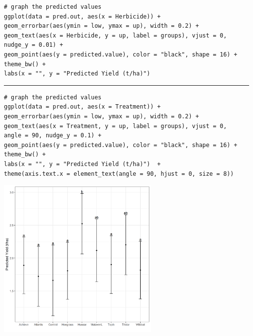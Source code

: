 \documentclass[a4paper, 10pt, fleqn, twosided]{memoir}
\begin{document}
\begin{tcolorbox}[title = Example 7 Graph of predicted values]
\begin{verbatim}
# graph the predicted values 
ggplot(data = pred.out, aes(x = Herbicide)) +
geom_errorbar(aes(ymin = low, ymax = up), width = 0.2) +
geom_text(aes(x = Herbicide, y = up, label = groups), vjust = 0, nudge_y = 0.01) +
geom_point(aes(y = predicted.value), color = "black", shape = 16) + theme_bw() +
labs(x = "", y = "Predicted Yield (t/ha)")
\end{verbatim}
{\color{code} {\hrule height 1pt}}
\begin{verbatim}
# graph the predicted values 
ggplot(data = pred.out, aes(x = Treatment)) +
geom_errorbar(aes(ymin = low, ymax = up), width = 0.2) +
geom_text(aes(x = Treatment, y = up, label = groups), vjust = 0,
angle = 90, nudge_y = 0.1) +
geom_point(aes(y = predicted.value), color = "black", shape = 16) + theme_bw() +
labs(x = "", y = "Predicted Yield (t/ha)")  +
theme(axis.text.x = element_text(angle = 90, hjust = 0, size = 8))
\end{verbatim}
\end{tcolorbox}


\begin{tcolorbox}[title = Example 7 Graph of predicted Control values]
\includegraphics[width=0.6\textwidth, frame]{Example7HerbicidePred.png}
\end{tcolorbox}
\end{document}

